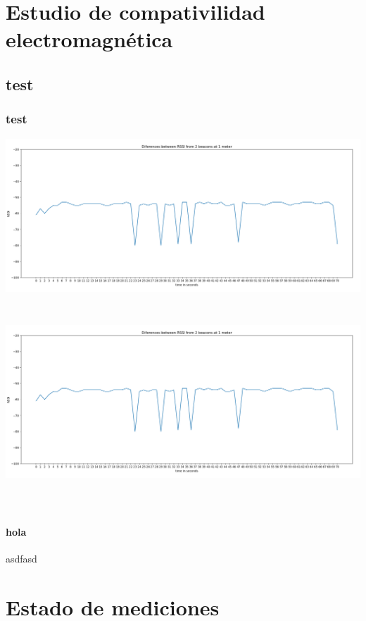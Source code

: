 \documentclass[a4paper ,12pt, onecolumn]{article}
\begin{document}
\section{Estudio de compativilidad electromagnética}
\subsection{test}
\subsubsection{test}

\includegraphics[scale=0.3]{5min_beacon_rssi}
\includegraphics[width=15cm, height=8cm]{5min_beacon_rssi}
\paragraph{hola}
asdfasd


\section{Estado de mediciones}
\end{document}
